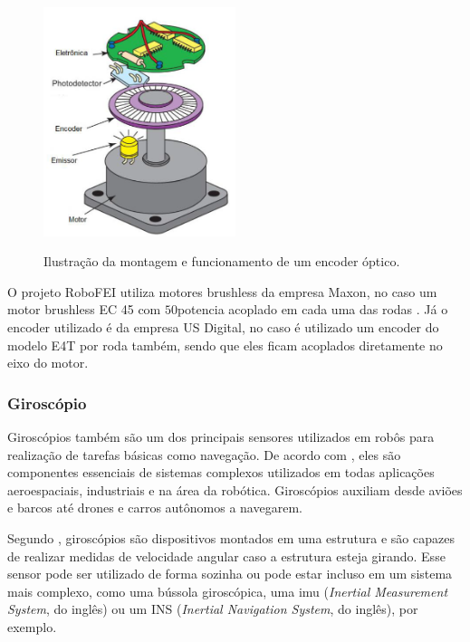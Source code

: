 \documentclass[acronym, symbols]{fei}
\begin{document}
				\begin{figure}[!htb]
					\centering
					\caption{Ilustração da montagem e funcionamento de um encoder óptico.} 
					\includegraphics[width=0.5\textwidth]{encoder_optico.png}
					\label{fig:optical_encoder}
				\end{figure}
				
				O projeto RoboFEI utiliza motores brushless da empresa Maxon\textregistered, no caso um motor brushless EC 45 com $50$\gls{potencia} acoplado em cada uma das rodas \cite{ec45_maxon}. Já o encoder utilizado é da empresa US Digital\textregistered \cite{e4t_encoder}, no caso é utilizado um encoder do modelo E4T por roda também, sendo que eles ficam acoplados diretamente no eixo do motor.
			
			\subsubsection{Giroscópio}
			
				Giroscópios também são um dos principais sensores utilizados em robôs para realização de tarefas básicas como navegação. De acordo com \textcite{jeremydingman2020}, eles são componentes essenciais de sistemas complexos utilizados em todas aplicações aeroespaciais, industriais e na área da robótica. Giroscópios auxiliam desde aviões e barcos até drones e carros autônomos a navegarem.
				
				Segundo \textcite{s17102284}, giroscópios são dispositivos montados em uma estrutura e são capazes de realizar medidas de velocidade angular caso a estrutura esteja girando. Esse sensor pode ser utilizado de forma sozinha ou pode estar incluso em um sistema mais complexo, como uma bússola giroscópica, uma \acrshort{imu} (\textit{Inertial Measurement System}, do inglês) ou um INS (\textit{Inertial Navigation System}, do inglês), por exemplo.
				
\end{document}
